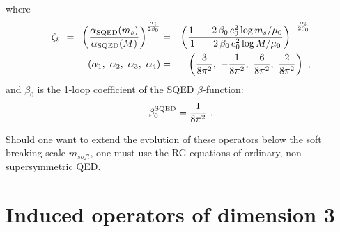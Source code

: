 \documentclass[paper,12pt]{revtex4}
\begin{document}
        where
\begin{eqnarray*}
        \zeta_i ~\, = ~\, 
	\left (
	  \frac{\alpha_{\rm SQED}(m_s)}
               {\alpha_{\rm SQED}(M)}
	\right )^
		{\frac{\alpha_i}
		      {2\beta_0}}
	& = &
	\left (
	   \frac{ 1 ~-~ 2\,\beta_0\, e_0^2 \log m_s/\mu_0 }
                { 1 ~-~ 2\,\beta_0\, e_0^2 \log M/\mu_0 }
        \right )^
             {- \frac{\alpha_i}{2\beta_0} } \\
	(\alpha_1,~ \alpha_2,~ \alpha_3,~ \alpha_4) & = &
	\left(  \frac{3}{8\pi^2},~ 
	      - \frac{1}{8\pi^2},~ 
	        \frac{6}{8\pi^2},~ 
		\frac{2}{8\pi^2} 
	\right)~,
\end{eqnarray*}
        and $ \beta_0 $ is the 1-loop coefficient of the
	SQED $ \beta $-function:
\[
        \beta_0^{\rm SQED} = \frac{1}{8\pi^2}~.
\]

	Should one want to extend the evolution of these operators below 
    the soft breaking scale $ m_{soft} $, one must use the RG equations of ordinary,
    non-supersymmetric QED. 

\section{Induced operators of dimension 3}
\label{InducedDim3}
\end{document}
